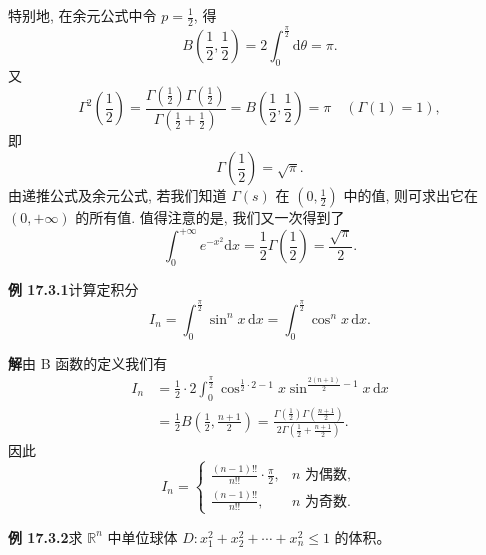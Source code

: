 \documentclass[UTF8, 12pt, fontset=fandol, oneside]{ctexart}
\begin{document}
特别地, 在余元公式中令 $p=\frac12$, 得
\[
  B\left(\frac12,\frac12\right)=2\int_0^{\frac\pi2}\mathrm d\theta=\pi.
\]
又
\[
  \Gamma^2\left(\frac12\right)
  =\frac{\Gamma\left(\frac12\right)\Gamma\left(\frac12\right)}
  {\Gamma\left(\frac12+\frac12\right)}
  =B\left(\frac12,\frac12\right)=\pi\quad(\Gamma(1)=1),
\]
即
\[
  \Gamma\left(\frac12\right)=\sqrt\pi.
\]
由递推公式及余元公式, 若我们知道 $\Gamma(s)$ 在 $\left(0,\frac12\right)$ 中的值, 则可求出它在 $(0,+\infty)$ 的所有值. 值得注意的是, 我们又一次得到了
\[
  \int_0^{+\infty}e^{-x^2}\mathrm dx=\frac12\Gamma\left(\frac12\right)=\frac{\sqrt\pi}{2}.
\]

\noindent\textbf{例 17.3.1}\quad 计算定积分
\[
  I_n=\int_0^{\frac\pi2}\sin^n x\,\mathrm dx
  =\int_0^{\frac\pi2}\cos^n x\,\mathrm dx.
\]

\noindent\textbf{解}\quad 由 B 函数的定义我们有
\[
\begin{aligned}
  I_n
  &=\frac12\cdot2\int_0^{\frac\pi2}\cos^{\frac12\cdot2-1}x
    \sin^{\frac{2(n+1)}2-1}x\,\mathrm dx\\
  &=\frac12 B\left(\frac12,\frac{n+1}{2}\right)
  =\frac{\Gamma\left(\frac12\right)\Gamma\left(\frac{n+1}{2}\right)}
  {2\Gamma\left(\frac12+\frac{n+1}{2}\right)}.
\end{aligned}
\]
因此
\[
I_n=
\begin{cases}
  \displaystyle \frac{(n-1)!!}{n!!}\cdot\frac\pi2, & n\text{ 为偶数},\\[1.2ex]
  \displaystyle \frac{(n-1)!!}{n!!}, & n\text{ 为奇数}.
\end{cases}
\]

\noindent\textbf{例 17.3.2}\quad 求 $\mathbb R^n$ 中单位球体 $D:x_1^2+x_2^2+\cdots+x_n^2\leqslant1$ 的体积。
\end{document}
